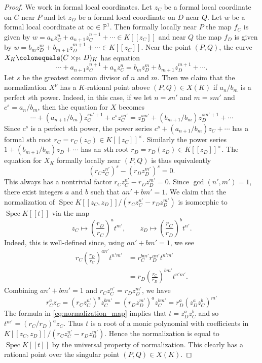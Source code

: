 \documentclass[a4paper,11pt]{amsart}
\theoremstyle{plain}
\theoremstyle{remark}
\DeclareMathOperator{\Spec}{Spec}
\renewcommand{\P}{\mathbb{P}}
\begin{document}
\begin{proof}
    We work in formal local coordinates.  Let \(z_C\) be a formal local coordinate on \(C\) near \(P\) and let \(z_D\) be a formal local coordinate on \(D\) near \(Q\).  Let \(w\) be a formal local coordinate at \(\infty \in \P^1\).  Then formally locally near \(P\) the map \(f_C\) is given by \(w = a_nz_C^n + a_{n+1} z_C^{n+1} + \cdots \in K[[z_C]]\) and near \(Q\) the map \(f_D\) is given by \(w = b_mz_D^m + b_{m+1}z_D^{m+1} + \cdots \in K[[z_C]]\).  Near the point \((P, Q)\), the curve \(X_K \colonequals (C \times_{\P^1} D)_K\) has equation 
    \begin{equation}\label{equationXinformallocalcoordinates}
        \cdots + a_{n+1}z_C^{n+1} + a_nz_C^n = b_mz_D^m + b_{m+1}z_D^{m+1} + \cdots. 
    \end{equation} 
    Let \(s\) be the greatest common divisor of \(n\) and \(m\).  Then we claim that the normalization \(X^\nu\) has a \(K\)-rational point above \((P,Q) \in X(K)\) if \(a_n/b_m\) is a perfect \(s\)th power.  Indeed, in this case, if we let \(n = sn'\) and \(m= sm'\) and \(c^s = a_n/b_m\), then the equation for \(X\) becomes
    \[\cdots + (a_{n+1}/b_m)z_C^{sn'+1} + c^sz_C^{sn'} = z_D^{sm'} + (b_{m+1}/b_m)z_D^{sm'+1} + \cdots\]
    Since \(c^s\) is a perfect \(s\)th power, the power series \(c^s + (a_{n+1}/b_m)z_C + \cdots \) has a formal \(s\)th root \(r_C = r_C(z_C)\in K[[z_C]]^\times\).  Similarly the power series \(1 + (b_{m+1}/b_m)z_D + \cdots\) has an \(s\)th root \(r_D = r_D(z_D)\in K[[z_D]]^\times\).  The equation for \(X_K\) formally locally near \((P,Q)\) is thus equivalently
    \[(r_C z_C^{n'})^s - (r_D z_D^{m'})^s = 0.\]
    This always has a nontrivial factor \(r_Cz_C^{n'} - r_D z_D^{m'} = 0\).  Since \(\gcd(n', m') = 1\), there exist integers \(a\) and \(b\) such that \(an' +bm' = 1\).  We claim that the normalization of \(\Spec K[[z_C, z_D]]/(r_Cz_C^{n'} - r_Dz_D^{m'})\) is isomorphic to \(\Spec K[[t]]\) via the map 
    \begin{equation}\label{eq:normalization_map}
        z_C\mapsto \left(\frac{r_D}{r_C}\right)^at^{m'}, \qquad z_D \mapsto \left(\frac{r_C}{r_D}\right)^bt^{n'}.
    \end{equation}
    Indeed, this is well-defined since, using \(an' +bm' = 1\), we see
    \begin{align*}
        r_C \left(\frac{r_D}{r_C}\right)^{an'}t^{n'm'} &= r_C^{bm'}r_D^{an'}t^{n'm'} \\
        &= r_D\left(\frac{r_C}{r_D}\right)^{bm'}t^{n'm'}.
    \end{align*}
    Combining \(an' +bm' = 1\) and \(r_Cz_C^{n'} = r_D z_D^{m'}\), we have 
    \[r_C^az_C = (r_Cz_C^{n'})^az_C^{bm'} = (r_Dz_D^{m'})^az_C^{bm'} = r_D^a(z_D^az_C^b)^{m'}\]
    The formula in \eqref{eq:normalization_map} implies that \(t = z_D^az_C^b\) and so 
    \(t^{m'} = (r_C/r_D)^a z_C\).  Thus \(t\) is a root of a monic polynomial with coefficients in \(K[[z_C, z_D]]/(r_Cz_C^{n'} - r_Dz_D^{m'})\).  Hence the normalization is equal to \(\Spec K[[t]]\) by the universal property of normalization.  This clearly has a rational point over the singular point \((P,Q) \in X(K)\). 


\end{proof}
\end{document}
